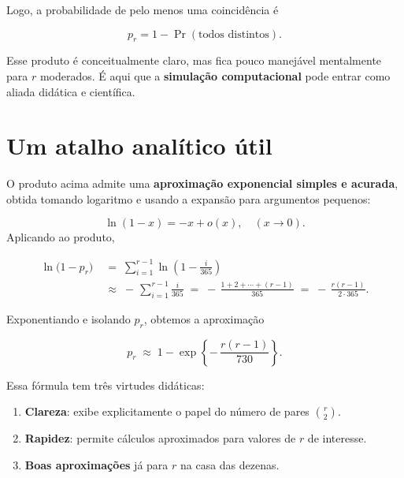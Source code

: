 \documentclass[
  letterpaper,
  DIV=11,
  numbers=noendperiod]{scrreprt}
\begin{document}
Logo, a probabilidade de pelo menos uma coincidência é

\[p_r = 1 - \Pr(\text{todos distintos}).\]

Esse produto é conceitualmente claro, mas fica pouco manejável
mentalmente para \(r\) moderados. É aqui que a \textbf{simulação
computacional} pode entrar como aliada didática e científica.

\section*{Um atalho analítico
útil}\label{um-atalho-analuxedtico-uxfatil}


O produto acima admite uma \textbf{aproximação exponencial simples e
acurada}, obtida tomando logaritmo e usando a expansão para argumentos
pequenos:

\[\ln(1 - x) = -x + o(x), \quad (x \to 0). \] Aplicando ao produto,

\[
\begin{aligned}
\ln\!\big(1 - p_r\big)
\;&=\;
\sum_{i=1}^{r-1} \ln\!\left(1 - \frac{i}{365}\right)\\
\;&\approx\;
-\,\sum_{i=1}^{r-1} \frac{i}{365}
\;=\;
-\,\frac{1 + 2 + \cdots + (r-1)}{365}
\;=\;
-\,\frac{r(r-1)}{2 \cdot 365}.\end{aligned}\]

Exponentiando e isolando \(p_r\), obtemos a aproximação

\[
p_r \;\approx\; 1 - \exp\!\left\{-\,\frac{r(r-1)}{730}\right\}.
\]

Essa fórmula tem três virtudes didáticas:

\begin{enumerate}
\def\labelenumi{\arabic{enumi})}
\item
  \textbf{Clareza}: exibe explicitamente o papel do número de pares
  \(\binom{r}{2}\).
\item
  \textbf{Rapidez}: permite cálculos aproximados para valores de \(r\)
  de interesse.
\item
  \textbf{Boas aproximações} já para \(r\) na casa das dezenas.
\end{enumerate}
\end{document}
